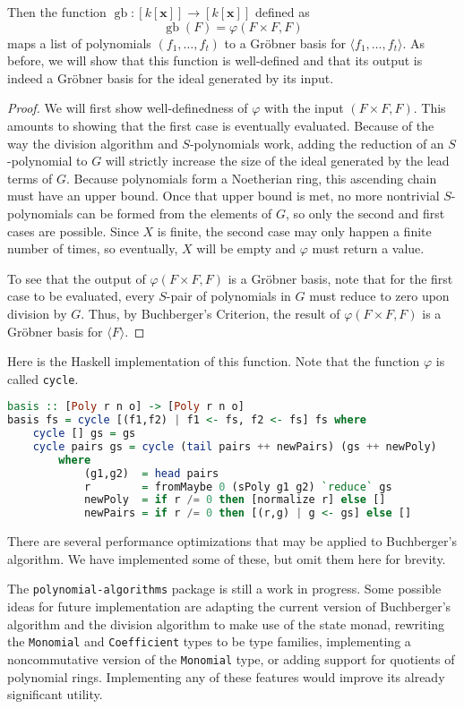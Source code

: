 \documentclass[MS, xcolor=dvipsnames]{wfuthesis}
\DeclareMathOperator{\gb}{gb}
\theoremstyle{definition}
\def\p{\varphi}
\begin{document}
Then the function $\gb: [k[\mathbf x]] \to [k[\mathbf x]]$ defined as
\[ \gb(F) = \p(F \times F,F) \]
maps a list of polynomials $(f_1,\dots,f_t)$ to a Gr\"obner basis for $\langle f_1,\dots,f_t \rangle$. As before, we will show that this function is well-defined and that its output is indeed a Gr\"obner basis for the ideal generated by its input.
\begin{proof}
  We will first show well-definedness of $\p$ with the input $(F \times F,F)$. This amounts to showing that the first case is eventually evaluated. Because of the way the division algorithm and $S$-polynomials work, adding the reduction of an $S$-polynomial to $G$ will strictly increase the size of the ideal generated by the lead terms of $G$. Because polynomials form a Noetherian ring, this ascending chain must have an upper bound. Once that upper bound is met, no more nontrivial $S$-polynomials can be formed from the elements of $G$, so only the second and first cases are possible. Since $X$ is finite, the second case may only happen a finite number of times, so eventually, $X$ will be empty and $\p$ must return a value. \par
  To see that the output of $\p(F \times F,F)$ is a Gr\"obner basis, note that for the first case to be evaluated, every $S$-pair of polynomials in $G$ must reduce to zero upon division by $G$. Thus, by Buchberger's Criterion, the result of $\p(F \times F,F)$ is a Gr\"obner basis for $\langle F \rangle$.
\end{proof}
Here is the Haskell implementation of this function. Note that the function $\p$ is called \lstinline{cycle}.
\begin{lstlisting}[language=Haskell]
basis :: [Poly r n o] -> [Poly r n o]
basis fs = cycle [(f1,f2) | f1 <- fs, f2 <- fs] fs where
    cycle [] gs = gs
    cycle pairs gs = cycle (tail pairs ++ newPairs) (gs ++ newPoly)
        where
            (g1,g2)  = head pairs
            r        = fromMaybe 0 (sPoly g1 g2) `reduce` gs
            newPoly  = if r /= 0 then [normalize r] else []
            newPairs = if r /= 0 then [(r,g) | g <- gs] else []
\end{lstlisting}
There are several performance optimizations that may be applied to Buchberger's algorithm. We have implemented some of these, but omit them here for brevity. \par 
The \lstinline{polynomial-algorithms} package is still a work in progress. Some possible ideas for future implementation are adapting the current version of Buchberger's algorithm and the division algorithm to make use of the state monad, rewriting the \lstinline{Monomial} and \lstinline{Coefficient} types to be type families, implementing a noncommutative version of the \lstinline{Monomial} type, or adding support for quotients of polynomial rings. Implementing any of these features would improve its already significant utility.
\end{document}
